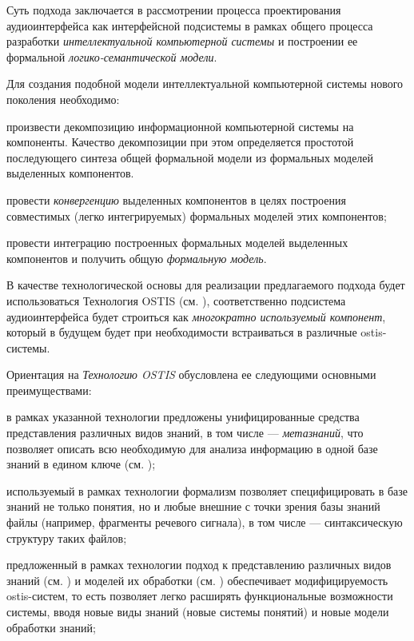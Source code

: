 Суть подхода заключается в рассмотрении процесса проектирования аудиоинтерфейса как интерфейсной подсистемы в рамках общего процесса разработки \textit{интеллектуальной компьютерной системы} и построении ее формальной \textit{логико-семантической модели}.

Для создания подобной модели интеллектуальной компьютерной системы нового поколения необходимо:
\begin{textitemize}    
    \item произвести декомпозицию информационной компьютерной системы на компоненты. Качество декомпозиции при этом определяется простотой последующего синтеза общей формальной модели из формальных моделей выделенных компонентов.
    \item провести \textit{конвергенцию} выделенных компонентов в целях построения совместимых (легко интегрируемых) формальных моделей этих компонентов;
    \item провести интеграцию построенных формальных моделей выделенных компонентов и получить общую \textit{формальную модель}.
\end{textitemize}

В качестве технологической основы для реализации предлагаемого подхода будет использоваться Технология OSTIS (см. ), соответственно подсистема аудиоинтерфейса будет строиться как \textit{многократно используемый компонент}, который в будущем будет при необходимости встраиваться в различные ostis-системы.

Ориентация на \textit{Технологию OSTIS} обусловлена ее следующими основными преимуществами:
\begin{textitemize}
\item в рамках указанной технологии предложены унифицированные средства представления различных видов знаний, в том числе --- \textit{метазнаний}, что позволяет описать всю необходимую для анализа информацию в одной базе знаний в едином ключе (см. );
\item используемый в рамках технологии формализм позволяет специфицировать в базе знаний не только понятия, но и любые внешние с точки зрения базы знаний файлы (например, фрагменты речевого сигнала), в том числе --- синтаксическую структуру таких файлов;
\item предложенный в рамках технологии подход к представлению различных видов знаний (см. ) и моделей их обработки (см. ) обеспечивает модифицируемость ostis-систем, то есть позволяет легко расширять функциональные возможности системы, вводя новые виды знаний (новые системы понятий) и новые модели обработки знаний;
\end{textitemize}


